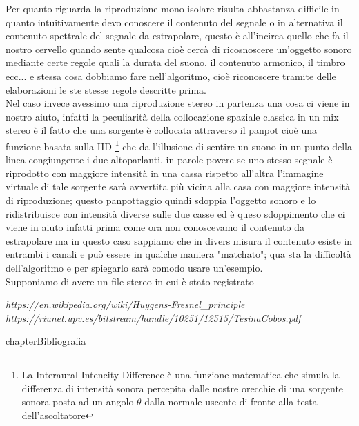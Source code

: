 \documentclass[12pt,a4paper]{report}
\begin{document}
Per quanto riguarda la riproduzione mono isolare risulta abbastanza difficile in quanto intuitivamente devo conoscere il contenuto del segnale o in alternativa il contenuto spettrale del segnale da estrapolare, questo è all'incirca quello che fa il nostro cervello quando sente qualcosa cioè cercà di ricosnoscere un'oggetto sonoro mediante certe regole quali la durata del suono, il contenuto armonico, il timbro ecc... e stessa cosa dobbiamo fare nell'algoritmo, cioè riconoscere tramite delle elaborazioni le ste stesse regole descritte prima.\\

Nel caso invece avessimo una riproduzione stereo in partenza una cosa ci viene in nostro aiuto, infatti la peculiarità della collocazione spaziale classica in un mix stereo è il fatto che una sorgente è collocata attraverso il panpot cioè una funzione basata sulla IID \footnote{La Interaural Intencity Difference è una funzione matematica che simula la differenza di intensità sonora percepita dalle nostre orecchie di una sorgente sonora posta ad un angolo $\theta$ dalla normale uscente di fronte alla testa dell'ascoltatore} che da l'illusione di sentire un suono in un punto della linea congiungente i due altoparlanti, in parole povere se uno stesso segnale è riprodotto con maggiore intensità in una cassa rispetto all'altra l'immagine virtuale di tale sorgente sarà avvertita più vicina alla casa con maggiore intensità di riproduzione; questo panpottaggio quindi sdoppia l'oggetto sonoro e lo ridistribuisce con intensità diverse sulle due casse ed è queso sdoppimento che ci viene in aiuto  infatti prima come ora non conoscevamo il contenuto da estrapolare ma in questo caso sappiamo che in divers misura il contenuto esiste in entrambi i canali e può essere in qualche maniera "matchato"; qua sta la difficoltà dell'algoritmo e per spiegarlo sarà comodo usare un'esempio.\\

Supponiamo di avere un file stereo in cui è stato registrato  





\begin{thebibliography}{}

 \textit{https://en.wikipedia.org/wiki/Huygens-Fresnel\_principle}
 \textit{https://riunet.upv.es/bitstream/handle/10251/12515/TesinaCobos.pdf}




\end{thebibliography}
 {chapter}{Bibliografia}
\end{document}
